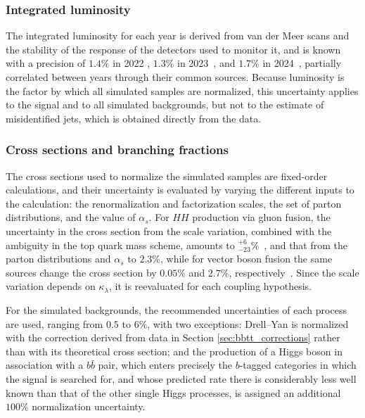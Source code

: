 \subsubsection{Integrated luminosity} 
%
The integrated luminosity for each year is derived from van der Meer scans and the stability of the response of the detectors used to monitor it, and is known with a precision of $1.4\%$ in 2022 \cite{CMS-PAS-LUM-22-001}, $1.3\%$ in 2023~\cite{CMS-DP-2024-068}, and $1.7\%$ in 2024~\cite{CMS-DP-2026-003}, partially correlated between years through their common sources. Because luminosity is the factor by which all simulated samples are normalized, this uncertainty applies to the signal and to all simulated backgrounds, but not to the estimate of misidentified jets, which is obtained directly from the data.

\subsubsection{Cross sections and branching fractions} 
%
The cross sections used to normalize the simulated samples are fixed-order calculations, and their uncertainty is evaluated by varying the different inputs to the calculation: the renormalization and factorization scales, the set of parton distributions, and the value of $\alpha_s$. For $HH$ production via gluon fusion, the uncertainty in the cross section from the scale variation, combined with the ambiguity in the top quark mass scheme, amounts to $^{+6}_{-23}\%$~\cite{Grazzini:2018bsd,Baglio:2020wgt}, and that from the parton distributions and $\alpha_s$ to $2.3\%$, while for vector boson fusion the same sources change the cross section by $0.05\%$ and $2.7\%$, respectively~\cite{Dreyer:2018qbw,Dreyer:2020xaj}. Since the scale variation depends on $\kappa_\lambda$, it is reevaluated for each coupling hypothesis.


For the simulated backgrounds, the recommended uncertainties of each process are used, ranging from $0.5$ to $6\%$\cite{LHCHWG-xsec-13p6TeV}, with two exceptions: Drell--Yan is normalized with the correction derived from data in Section \ref{sec:bbtt_corrections} rather than with its theoretical cross section; and the production of a Higgs boson in association with a $b\bar{b}$ pair, which enters precisely the $b$-tagged categories in which the signal is searched for, and whose predicted rate there is considerably less well known than that of the other single Higgs processes\cite{bbH-modelling}, is assigned an additional $100\%$ normalization uncertainty.

